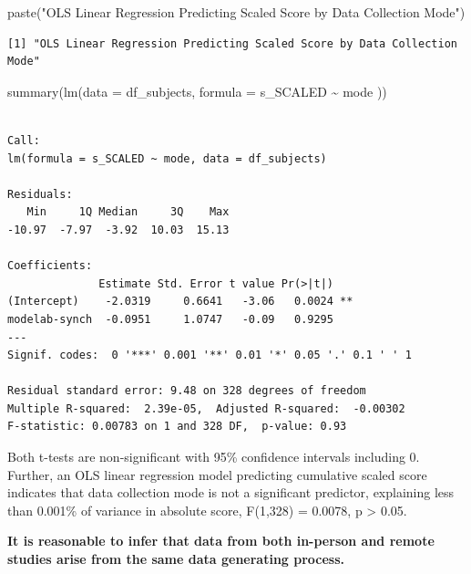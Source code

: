 \documentclass[
  letterpaper,
  DIV=11,
  numbers=noendperiod]{scrreprt}
\newenvironment{Shaded}{\begin{snugshade}}{\end{snugshade}}
\newcommand{\AttributeTok}[1]{\textcolor[rgb]{0.40,0.45,0.13}{#1}}
\newcommand{\FunctionTok}[1]{\textcolor[rgb]{0.28,0.35,0.67}{#1}}
\newcommand{\NormalTok}[1]{\textcolor[rgb]{0.00,0.23,0.31}{#1}}
\newcommand{\SpecialCharTok}[1]{\textcolor[rgb]{0.37,0.37,0.37}{#1}}
\newcommand{\StringTok}[1]{\textcolor[rgb]{0.13,0.47,0.30}{#1}}
\begin{document}
\begin{Shaded}
\begin{Highlighting}[]
\FunctionTok{paste}\NormalTok{(}\StringTok{"OLS Linear Regression Predicting Scaled Score by Data Collection Mode"}\NormalTok{)}
\end{Highlighting}
\end{Shaded}

\begin{verbatim}
[1] "OLS Linear Regression Predicting Scaled Score by Data Collection Mode"
\end{verbatim}

\begin{Shaded}
\begin{Highlighting}[]
\FunctionTok{summary}\NormalTok{(}\FunctionTok{lm}\NormalTok{(}\AttributeTok{data =}\NormalTok{ df\_subjects, }\AttributeTok{formula =}\NormalTok{ s\_SCALED }\SpecialCharTok{\textasciitilde{}}\NormalTok{ mode ))}
\end{Highlighting}
\end{Shaded}

\begin{verbatim}

Call:
lm(formula = s_SCALED ~ mode, data = df_subjects)

Residuals:
   Min     1Q Median     3Q    Max 
-10.97  -7.97  -3.92  10.03  15.13 

Coefficients:
              Estimate Std. Error t value Pr(>|t|)   
(Intercept)    -2.0319     0.6641   -3.06   0.0024 **
modelab-synch  -0.0951     1.0747   -0.09   0.9295   
---
Signif. codes:  0 '***' 0.001 '**' 0.01 '*' 0.05 '.' 0.1 ' ' 1

Residual standard error: 9.48 on 328 degrees of freedom
Multiple R-squared:  2.39e-05,  Adjusted R-squared:  -0.00302 
F-statistic: 0.00783 on 1 and 328 DF,  p-value: 0.93
\end{verbatim}

Both t-tests are non-significant with 95\% confidence intervals
including 0. Further, an OLS linear regression model predicting
cumulative scaled score indicates that data collection mode is not a
significant predictor, explaining less than 0.001\% of variance in
absolute score, F(1,328) = 0.0078, p \textgreater{} 0.05.

\begin{tcolorbox}[standard jigsaw,colframe=quarto-callout-color-frame, arc=.35mm, titlerule=0mm, toptitle=1mm, bottomtitle=1mm, rightrule=.15mm, title={Decision}, leftrule=.75mm, toprule=.15mm, bottomrule=.15mm, opacityback=0, colbacktitle=quarto-callout-color!10!white, left=2mm, opacitybacktitle=0.6, coltitle=black, colback=white]
\textbf{It is reasonable to infer that data from both in-person and
remote studies arise from the same data generating process.}
\end{tcolorbox}
\end{document}
